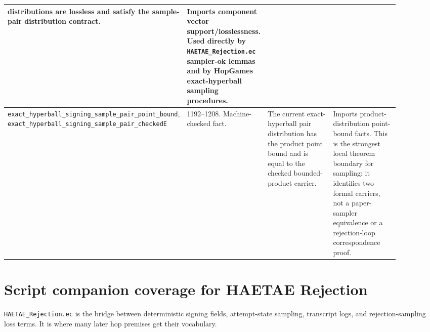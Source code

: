 \documentclass[11pt]{report}
\DeclareRobustCommand{\file}[1]{\ifmmode\text{\nolinkurl{#1}}\else\nolinkurl{#1}\fi}
\DeclareRobustCommand{\ec}[1]{\ifmmode\text{\nolinkurl{#1}}\else\nolinkurl{#1}\fi}
\theoremstyle{definition}
\theoremstyle{plain}
\begin{document}
{\begin{longtable}{p{0.25\linewidth}p{0.14\linewidth}p{0.28\linewidth}p{0.23\linewidth}}
distributions are lossless and satisfy the sample-pair distribution contract. &
Imports component vector support/losslessness.  Used directly by
\file{HAETAE\_Rejection.ec} sampler-ok lemmas and by HopGames exact-hyperball
sampling procedures. \\
\midrule
\ec{exact\_hyperball\_signing\_sample\_pair\_point\_bound},
\ec{exact\_hyperball\_signing\_sample\_pair\_checkedE} &
1192--1208. Machine-checked fact. &
The current exact-hyperball pair distribution has the product point bound and
is equal to the checked bounded-product carrier. &
Imports product-distribution point-bound facts.  This is the strongest local
theorem boundary for sampling: it identifies two formal carriers, not a
paper-sampler equivalence or a rejection-loop correspondence proof. \\
\bottomrule
\end{longtable}
}

\section{Script companion coverage for HAETAE Rejection}

\file{HAETAE\_Rejection.ec} is the bridge between deterministic signing fields,
attempt-state sampling, transcript logs, and rejection-sampling loss terms.
It is where many later hop premises get their vocabulary.
\end{document}
